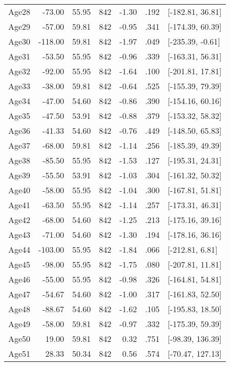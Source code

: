 \begin{table}[ht]
\begin{tabular}{lrrrrrl}
  Age28 & -73.00 & 55.95 & 842 & -1.30 & .192 & [-182.81, 36.81] \\ 
  Age29 & -57.00 & 59.81 & 842 & -0.95 & .341 & [-174.39, 60.39] \\ 
  Age30 & -118.00 & 59.81 & 842 & -1.97 & .049 & [-235.39, -0.61] \\ 
  Age31 & -53.50 & 55.95 & 842 & -0.96 & .339 & [-163.31, 56.31] \\ 
  Age32 & -92.00 & 55.95 & 842 & -1.64 & .100 & [-201.81, 17.81] \\ 
  Age33 & -38.00 & 59.81 & 842 & -0.64 & .525 & [-155.39, 79.39] \\ 
  Age34 & -47.00 & 54.60 & 842 & -0.86 & .390 & [-154.16, 60.16] \\ 
  Age35 & -47.50 & 53.91 & 842 & -0.88 & .379 & [-153.32, 58.32] \\ 
  Age36 & -41.33 & 54.60 & 842 & -0.76 & .449 & [-148.50, 65.83] \\ 
  Age37 & -68.00 & 59.81 & 842 & -1.14 & .256 & [-185.39, 49.39] \\ 
  Age38 & -85.50 & 55.95 & 842 & -1.53 & .127 & [-195.31, 24.31] \\ 
  Age39 & -55.50 & 53.91 & 842 & -1.03 & .304 & [-161.32, 50.32] \\ 
  Age40 & -58.00 & 55.95 & 842 & -1.04 & .300 & [-167.81, 51.81] \\ 
  Age41 & -63.50 & 55.95 & 842 & -1.14 & .257 & [-173.31, 46.31] \\ 
  Age42 & -68.00 & 54.60 & 842 & -1.25 & .213 & [-175.16, 39.16] \\ 
  Age43 & -71.00 & 54.60 & 842 & -1.30 & .194 & [-178.16, 36.16] \\ 
  Age44 & -103.00 & 55.95 & 842 & -1.84 & .066 & [-212.81, 6.81] \\ 
  Age45 & -98.00 & 55.95 & 842 & -1.75 & .080 & [-207.81, 11.81] \\ 
  Age46 & -55.00 & 55.95 & 842 & -0.98 & .326 & [-164.81, 54.81] \\ 
  Age47 & -54.67 & 54.60 & 842 & -1.00 & .317 & [-161.83, 52.50] \\ 
  Age48 & -88.67 & 54.60 & 842 & -1.62 & .105 & [-195.83, 18.50] \\ 
  Age49 & -58.00 & 59.81 & 842 & -0.97 & .332 & [-175.39, 59.39] \\ 
  Age50 & 19.00 & 59.81 & 842 & 0.32 & .751 & [-98.39, 136.39] \\ 
  Age51 & 28.33 & 50.34 & 842 & 0.56 & .574 & [-70.47, 127.13] \\ 

\end{tabular}
\end{table}
